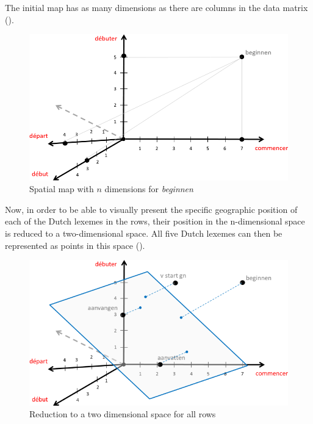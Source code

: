The initial map has as many dimensions as there are columns in the data matrix ().

\begin{figure}
\includegraphics[height=.3\textheight]{figures/Vandevoorde2-img16.png}
\caption{Spatial map with $n$ dimensions for \textit{beginnen} \label{fig:3:16}}
\end{figure}

Now, in order to be able to visually present the specific geographic position of each of the Dutch lexemes in the rows, their position in the n-dimensional space is reduced to a two-dimensional space. All five Dutch lexemes can then be  represented as points in this space ().

\begin{figure}
\includegraphics[height=.3\textheight]{figures/Vandevoorde2-img17.png}
\caption{Reduction to a two dimensional space for all rows \label{fig:3:17}}
\end{figure}

